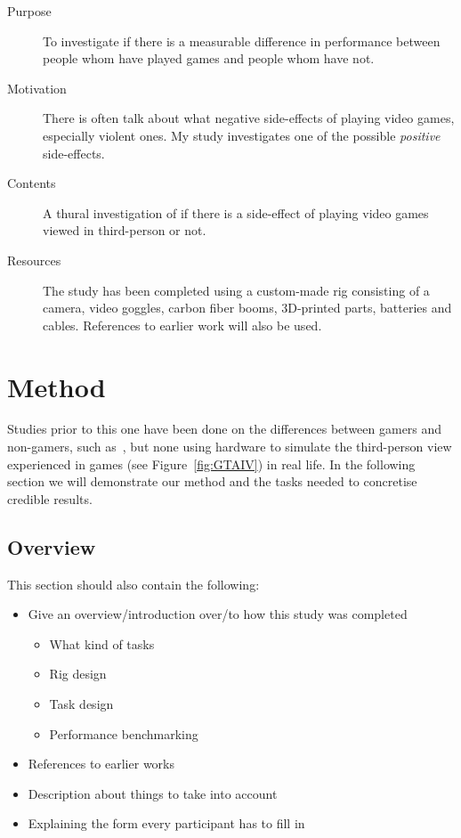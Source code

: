\documentclass[runningheads,a4paper,oribibl]{llncs}
\begin{document}
\begin{description}
   \item[Purpose] To investigate if there is a measurable difference in performance between people whom have played games and people whom have not.
   \item[Motivation] There is often talk about what negative side-effects of playing video games, especially violent ones. My study investigates one of the possible \emph{positive} side-effects.
   \item[Contents] A thural investigation of if there is a side-effect of playing video games viewed in third-person or not.
   \item[Resources] The study has been completed using a custom-made rig consisting of a camera, video goggles, carbon fiber booms, 3D-printed parts, batteries and cables. References to earlier work will also be used.
\end{description}








\section{Method}
Studies prior to this one have been done on the differences between gamers and non-gamers, such as~\cite{schmierbach2011exploring}, but none using hardware to simulate the third-person view experienced in games (see Figure~\ref{fig:GTAIV}) in real life. In the following section we will demonstrate our method and the tasks needed to concretise credible results.

\subsection{Overview}

This section should also contain the following:
\begin{itemize}
	\item Give an overview/introduction over/to how this study was completed
	\begin{itemize}
		\item What kind of tasks
		\item Rig design
		\item Task design
		\item Performance benchmarking
	\end{itemize}
	\item References to earlier works
	\item Description about things to take into account
	\item Explaining the form every participant has to fill in
\end{itemize}
\end{document}
